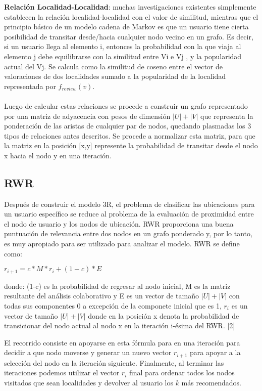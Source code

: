 \documentclass[runningheads]{llncs}
\begin{document}
\textbf{Relación Localidad-Localidad}: muchas investigaciones existentes simplemente establecen la relación localidad-localidad con el valor de similitud, mientras que el principio básico de un modelo cadena de Markov es que un usuario tiene cierta posibilidad de transitar desde/hacia cualquier nodo vecino en un grafo. Es decir, si un usuario llega al elemento i, entonces la probabilidad con la que viaja al elemento j debe equilibrarse con la similitud entre Vi e Vj , y la popularidad actual del Vj. Se calcula como la similitud de coseno entre el vector de valoraciones de dos localidades sumado a la popularidad de la localidad representada por $f_{review}(v)$.
\\
\\
Luego de calcular estas relaciones se procede a construir un grafo representado por una matriz de adyacencia con pesos de dimensión $|U|+|V|$ que representa la ponderación de las aristas de cualquier par de nodos, quedando plasmadas los 3 tipos de relaciones antes descritos. Se procede a normalizar esta matriz, para que la matriz en la posición [x,y] represente la probabilidad de transitar desde el nodo x hacia el nodo y en una iteración.

\subsection{RWR}
Después de construir el modelo 3R, el problema de clasificar las ubicaciones para un usuario específico se reduce al problema de la evaluación de proximidad entre el nodo de usuario y los nodos de ubicación. RWR proporciona una buena puntuación de relevancia entre dos nodos en un grafo ponderado y, por lo tanto, es muy apropiado para ser utilizado para analizar el modelo. RWR se define como: 

$r_{i+1} = c*M*r_i + (1-c)*E$

donde: (1-c) es la probabilidad de regresar al nodo inicial, M es la matriz resultante del análisis colaborativo y E es un vector de tamaño $|U|+|V|$ con todas sus componentes 0 a excepción de la componete inicial que es 1, $r_i$ es un vector de tamaño $|U|+|V|$ donde en la posición x denota la probabilidad de transicionar del nodo actual al nodo x en la iteración i-ésima del RWR. [2]

El recorrido consiste en apoyarse en esta fórmula para en una iteración para decidir a que nodo moverse y generar un nuevo vector $r_{i+1}$ para apoyar a la selección del nodo en la iteración siguiente. Finalmente, al terminar las iteraciones podemos utilizar el vector $r_i$ final para ordenar todos los nodos visitados que sean localidades y devolver al usuario los $k$ más recomendados.
\end{document}
